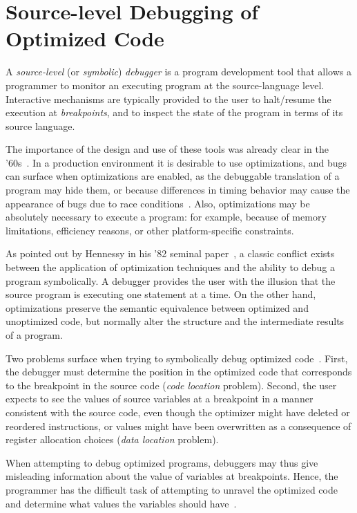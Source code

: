 
\section{Source-level Debugging of Optimized Code}
\label{se:CS-debug}
A {\em source-level} (or {\em symbolic}) {\em debugger} is a program development tool that allows a programmer to monitor an executing program at the source-language level. Interactive mechanisms are typically provided to the user to halt/resume the execution at {\em breakpoints}, and to inspect the state of the program in terms of its source language.

The importance of the design and use of these tools was already clear in the '60s~\cite{Evans66}. In a production environment it is desirable to use optimizations, and bugs can surface when optimizations are enabled, as the debuggable translation of a program may hide them, or because differences in timing behavior may cause the appearance of bugs due to race conditions~\cite{Adl-Tabatabai96thesis}. Also, optimizations may be absolutely necessary to execute a program: for example, because of memory limitations, efficiency reasons, or other platform-specific constraints.

As pointed out by Hennessy in his '82 seminal paper~\cite{Hennessy82}, a classic conflict exists between the application of optimization techniques and the ability to debug a program symbolically. A debugger provides the user with the illusion that the source program is executing one statement at a time. On the other hand, optimizations preserve the semantic equivalence between optimized and unoptimized code, but normally alter the structure and the intermediate results of a program.

Two problems surface when trying to symbolically debug optimized code~\cite{Adl-Tabatabai96,Jaramillo00}. First, the debugger must determine the position in the optimized code that corresponds to the breakpoint in the source code ({\em code location} problem). Second, the user expects to see the values of source variables at a breakpoint in a manner consistent with the source code, even though the optimizer might have 
deleted or reordered instructions, or values might have been overwritten as a consequence of register allocation choices ({\em data location} problem).

\noindent When attempting to debug optimized programs, debuggers may thus give misleading information about the value of variables at breakpoints. Hence, the programmer has the difficult task of attempting to unravel the optimized code and determine what values the variables should have~\cite{Hennessy82}.

